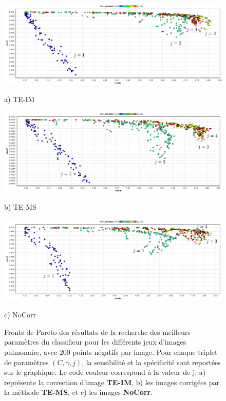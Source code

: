 \begin{figure}[h!]

\begin{center}
 \includegraphics[width=14cm]{images/pareto_mod_IM}

{\small a) TE-IM}
\vspace{0.5cm}

\includegraphics[width=14cm]{images/pareto_mod_LOR}
 
{\small b) TE-MS}
\vspace{0.5cm}

\includegraphics[width=14cm]{images/pareto_mod_NoCorr}

{\small c) NoCorr}

\end{center}
 \caption[Fronts de Pareto des résultats de la recherche des meilleurs paramètres du classifieur pour les différents jeux d'images pulmonaire]{Fronts de Pareto des résultats de la recherche des meilleurs paramètres du classifieur pour les différents jeux d'images pulmonaire, avec 200 points négatifs par image. Pour chaque triplet de paramètres $(C, \gamma, j)$, la sensibilité et la spécificité sont reportées sur le graphique. Le code couleur correspond à la valeur de j. a) représente la correction d'image \textbf{TE-IM}, b) les images corrigées par la méthode \textbf{TE-MS}, et c) les images \textbf{NoCorr}.}
\label{fig:paretoModalite} 
\end{figure}








